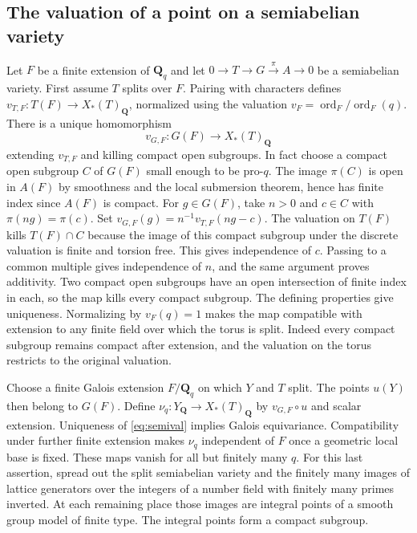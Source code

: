 \documentclass[11pt]{amsart}
\numberwithin{equation}{section}
\theoremstyle{definition}
\theoremstyle{remark}
\newcommand{\Q}{\mathbf Q}
\newcommand{\ord}{\operatorname{ord}}
\begin{document}
\subsection{The valuation of a point on a semiabelian variety}

Let $F$ be a finite extension of $\Q_q$ and let
$0\to T\to G\xrightarrow{\pi} A\to0$ be a semiabelian variety.
First assume $T$ splits over $F$. Pairing with characters
defines $v_{T,F}:T(F)\to X_*(T)_\Q$, normalized using the
valuation $v_F=\ord_F/\ord_F(q)$. There is a unique homomorphism
\begin{equation}\label{eq:semival}
 v_{G,F}:G(F)\longrightarrow X_*(T)_\Q
\end{equation}
extending $v_{T,F}$ and killing compact open subgroups.
In fact choose a compact open subgroup $C$ of $G(F)$ small
enough to be pro-$q$. The image $\pi(C)$ is open in $A(F)$
by smoothness and the local submersion theorem, hence has
finite index since $A(F)$ is compact. For $g\in G(F)$, take
$n>0$ and $c\in C$ with $\pi(ng)=\pi(c)$. Set
$v_{G,F}(g)=n^{-1}v_{T,F}(ng-c)$.
The valuation on $T(F)$ kills $T(F)\cap C$ because the image
of this compact subgroup under the discrete valuation is
finite and torsion free. This gives independence of $c$.
Passing to a common multiple gives independence of $n$,
and the same argument proves additivity. Two compact open
subgroups have an open intersection of finite index in each,
so the map kills every compact subgroup. The defining
properties give uniqueness. Normalizing by $v_F(q)=1$
makes the map compatible with extension to any finite field
over which the torus is split. Indeed every compact subgroup
remains compact after extension, and the valuation on the
torus restricts to the original valuation.

Choose a finite Galois extension $F/\Q_q$ on which $Y$ and $T$
split. The points $u(Y)$ then belong to $G(F)$. Define
$\nu_q:Y_\Q\to X_*(T)_\Q$ by $v_{G,F}\circ u$ and
scalar extension. Uniqueness of \eqref{eq:semival} implies
Galois equivariance. Compatibility under further finite
extension makes $\nu_q$ independent of $F$ once a geometric
local base is fixed. These maps vanish for all but finitely
many $q$. For this last assertion, spread out the split
semiabelian variety and the finitely many images of lattice
generators over the integers of a number field with finitely
many primes inverted. At each remaining place those images
are integral points of a smooth group model of finite type.
The integral points form a compact subgroup.
\end{document}

